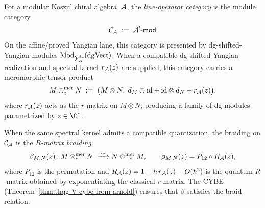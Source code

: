 \begin{definition}
\label{def:thqg-V-line-operator-category}
For a modular Koszul chiral algebra~$\mathcal{A}$, the
\emph{line-operator category} is the module category
\begin{equation}\label{eq:thqg-V-line-category}
\mathcal{C}_{\mathcal{A}}
\;:=\;
\mathcal{A}^!\text{-}\mathsf{mod}
\end{equation}
On the affine/proved Yangian lane, this category is presented by
dg-shifted-Yangian modules
$\mathrm{Mod}_{\mathcal{Y}^{\mathrm{dg}}_{\mathcal{A}}}(\mathrm{dgVect})$. When a compatible
dg-shifted-Yangian realization and spectral kernel $r_{\mathcal{A}}(z)$ are
supplied, this category carries a meromorphic tensor product
\begin{equation}\label{eq:thqg-V-meromorphic-tensor}
M \otimes^{\mathrm{mer}}_z N
\;:=\;
\bigl(M \otimes N,\;
d_M \otimes \mathrm{id} + \mathrm{id} \otimes d_N + r_{\mathcal{A}}(z)\bigr),
\end{equation}
where $r_{\mathcal{A}}(z)$ acts as the $r$-matrix on $M \otimes N$,
producing a family of dg modules parametrized by $z \in \C^*$.

When the same spectral kernel admits a compatible quantization, the
braiding on $\mathcal{C}_{\mathcal{A}}$ is the \emph{$R$-matrix braiding}:
\begin{equation}\label{eq:thqg-V-braiding}
\beta_{M,N}(z)\colon
M \otimes^{\mathrm{mer}}_z N
\;\xrightarrow{\;\sim\;}
N \otimes^{\mathrm{mer}}_{-z} M,
\qquad
\beta_{M,N}(z) = P_{12} \circ R_{\mathcal{A}}(z),
\end{equation}
where $P_{12}$ is the permutation and $R_{\mathcal{A}}(z) = 1 + \hbar\,r_{\mathcal{A}}(z) +
O(\hbar^2)$ is the quantum $R$-matrix obtained by exponentiating the
classical $r$-matrix. The CYBE
(Theorem~\ref{thm:thqg-V-cybe-from-arnold}) ensures that $\beta$
satisfies the braid relation.
\end{definition}

